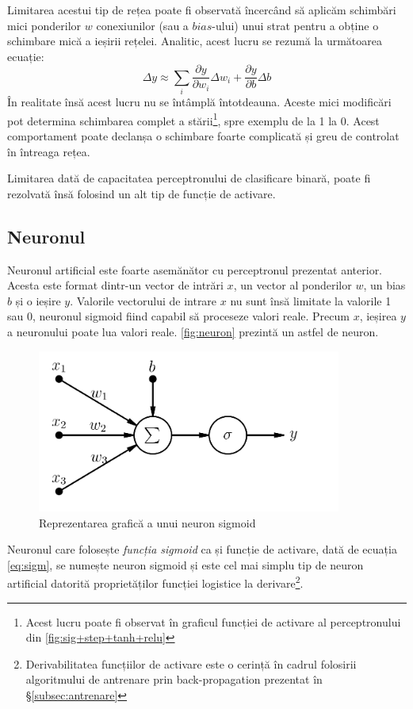 Limitarea acestui tip de rețea poate fi observată încercând să aplicăm schimbări mici ponderilor $w$ conexiunilor (sau a $bias$-ului) unui strat pentru a obține o schimbare mică a ieșirii rețelei. Analitic, acest lucru se rezumă la următoarea ecuație:
\begin{equation}
\Delta y\approx\sum_i\frac{\partial y}{\partial w_i}\Delta w_i + \frac{\partial y}{\partial b}\Delta b
\end{equation}
În realitate însă acest lucru nu se întâmplă întotdeauna. Aceste mici modificări pot determina schimbarea complet a stării\footnote{Acest lucru poate fi observat în graficul funcției de activare al perceptronului din \autoref{fig:sig+step+tanh+relu}}, spre exemplu de la 1 la 0. Acest comportament poate declanșa o schimbare foarte complicată și greu de controlat în întreaga rețea.

Limitarea dată de capacitatea perceptronului de clasificare binară, poate fi rezolvată însă folosind un alt tip de funcție de activare. 

\subsection{Neuronul}\label{subsec:neuronul}
Neuronul artificial este foarte asemănător cu perceptronul prezentat anterior. Acesta este format dintr-un vector de intrări $x$, un vector al ponderilor $w$, un bias $b$ și o ieșire $y$. Valorile vectorului de intrare $x$ nu sunt însă limitate la valorile 1 sau 0, neuronul sigmoid fiind capabil să proceseze valori reale. Precum $x$, ieșirea $y$ a neuronului poate lua valori reale. \autoref{fig:neuron} prezintă un astfel de neuron.
\begin{figure}[ht]
\centering
\includegraphics[width=10cm,keepaspectratio]{fig/cap2/artificial-neuron.png}
\caption{Reprezentarea grafică a unui neuron sigmoid}\label{fig:neuron}
\end{figure}

Neuronul care folosește \textit{funcția sigmoid} ca și funcție de activare, dată de ecuația \eqref{eq:sigm}, se numește neuron sigmoid și este cel mai simplu tip de neuron artificial datorită proprietăților funcției logistice la derivare\footnote{Derivabilitatea funcțiilor de activare este o cerință în cadrul folosirii algoritmului de antrenare prin back-propagation prezentat în \S\ref{subsec:antrenare}}.

